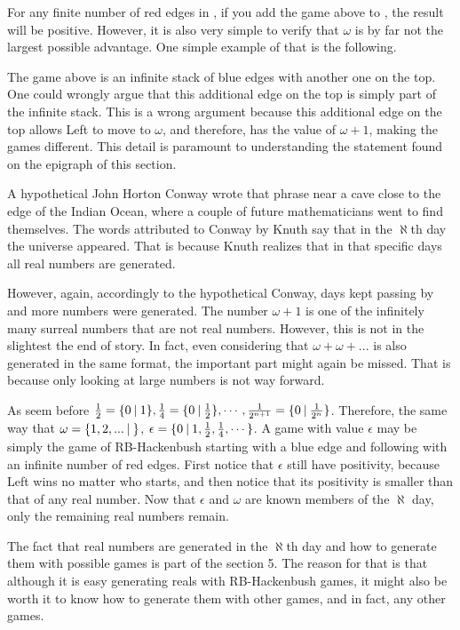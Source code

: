 For any finite number of red edges in \Gm{}, if you add the game above to \Gm{}, the result will be positive. However, it is also very simple to verify that $\omega$ is by far not the largest possible advantage. One simple  example of that is the following.



The game above is an infinite stack of blue edges with another one on the top. One could wrongly argue that this additional edge on the top is simply part of the infinite stack. This is a wrong argument because this additional edge on the top allows Left to move to $\omega$, and therefore, has the value of $\omega+1$, making the games different. This detail is paramount to understanding the statement found on the epigraph of this section.

A hypothetical John Horton Conway wrote that phrase near a cave close to the edge of the Indian Ocean, where a couple of future mathematicians went to find themselves. The words attributed to Conway by Knuth say that in the $\aleph$th day the universe appeared. That is because Knuth realizes that in that specific days all real numbers are generated.

However, again, accordingly to the hypothetical Conway, days kept passing by and more numbers were generated. The number $\omega+1$ is one of the infinitely many surreal numbers that are not real numbers. However, this is not in the slightest the end of story. In fact, even considering that $\omega + \omega + ...$  is also generated in the same format, the important part might again be missed. That is because only looking at large numbers is not way forward.

As seem before $\frac{1}{2} = \mbox{$\{0\:|\:1\}$}, \frac{1}{4} = \mbox{$\{0\:|\:\frac{1}{2}\}$}, \cdots, \frac{1}{2^{n+1}} = \mbox{$\{0\:|\:\frac{1}{2^n}\}$}$. Therefore, the same way that $\omega=\mbox{$\{1,2,...\:|\:\}$}$, $\epsilon=\mbox{$\{0\:|\:1,\frac{1}{2},\frac{1}{4},\cdots\}$}$. A game with value $\epsilon$ may be simply the game of RB-Hackenbush starting with a blue edge and following with an infinite number of red edges. First notice that $\epsilon$ still have positivity, because Left wins no matter who starts, and then notice that its positivity is smaller than that of any real number. Now that $\epsilon$ and $\omega$ are known members of the $\aleph$ day, only the remaining real numbers remain.

The fact that real numbers are generated in the $\aleph$th day and how to generate them with possible games is part of the section 5. The reason for that is that although it is easy generating reals with RB-Hackenbush games, it might also be worth it to know how to generate them with other games, and in fact, any other games.

